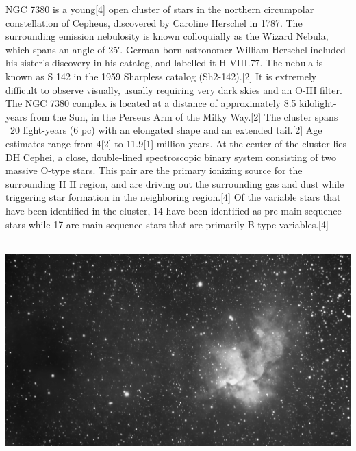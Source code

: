 {\footnotesize\color{white}
NGC 7380 is a young[4] open cluster of stars in the northern circumpolar constellation of Cepheus, discovered by Caroline Herschel in 1787. The surrounding emission nebulosity is known colloquially as the Wizard Nebula, which spans an angle of 25′. German-born astronomer William Herschel included his sister's discovery in his catalog, and labelled it H VIII.77. The nebula is known as S 142 in the 1959 Sharpless catalog (Sh2-142).[2] It is extremely difficult to observe visually, usually requiring very dark skies and an O-III filter. The NGC 7380 complex is located at a distance of approximately 8.5 kilolight-years from the Sun, in the Perseus Arm of the Milky Way.[2] The cluster spans ~20 light-years (6 pc) with an elongated shape and an extended tail.[2] Age estimates range from 4[2] to 11.9[1] million years. At the center of the cluster lies DH Cephei, a close, double-lined spectroscopic binary system consisting of two massive O-type stars. This pair are the primary ionizing source for the surrounding H II region, and are driving out the surrounding gas and dust while triggering star formation in the neighboring region.[4] Of the variable stars that have been identified in the cluster, 14 have been identified as pre-main sequence stars while 17 are main sequence stars that are primarily B-type variables.[4]


}\ \\
\includegraphics[width=\textwidth]{../Imaging//Grayscale/Wizard_Nebula.jpg}
